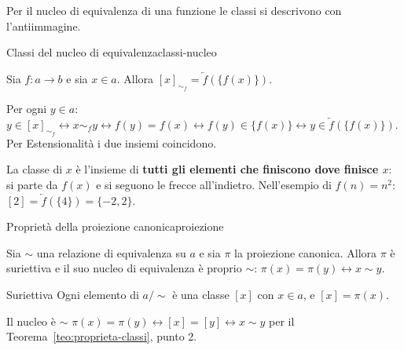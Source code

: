 Per il nucleo di equivalenza di una funzione le classi si descrivono con l'antiimmagine.

\begin{concetto}
\begin{Proposizione}{Classi del nucleo di equivalenza}{classi-nucleo}
    \begin{prerequisiti}
    \end{prerequisiti}
    Sia $f \colon a \to b$ e sia $x \in a$. Allora $[x]_{\sim_f} = \overleftarrow{f}(\{f(x)\})$.
\end{Proposizione}
\begin{dimostrazione}
    Per ogni $y \in a$:\quad $y \in [x]_{\sim_f} \leftrightarrow x \sim_f y \leftrightarrow f(y) = f(x) \leftrightarrow f(y) \in \{f(x)\}
    \leftrightarrow y \in \overleftarrow{f}(\{f(x)\})$. Per Estensionalità i due insiemi coincidono.
\end{dimostrazione}
\end{concetto}

\begin{spiegazione}
    La classe di $x$ è l'insieme di \textbf{tutti gli elementi che finiscono dove finisce $x$}: si parte da $f(x)$ e si
    seguono le frecce all'indietro. Nell'esempio di $f(n) = n^2$: $[2] = \overleftarrow{f}(\{4\}) = \{-2, 2\}$.
\end{spiegazione}


\begin{concetto}
\begin{Proposizione}{Proprietà della proiezione canonica}{proiezione}
    \begin{prerequisiti}
    \end{prerequisiti}
    Sia $\sim$ una relazione di equivalenza su $a$ e sia $\pi$ la proiezione canonica. Allora $\pi$ è suriettiva e il suo nucleo
    di equivalenza è proprio $\sim$: $\pi(x) = \pi(y) \leftrightarrow x \sim y$.
\end{Proposizione}
\begin{dimostrazione}
    \begin{caso}{Suriettiva}
        Ogni elemento di $a/{\sim}$ è una classe $[x]$ con $x \in a$, e $[x] = \pi(x)$.
    \end{caso}
    \begin{caso}{Il nucleo è $\sim$}
        $\pi(x) = \pi(y) \leftrightarrow [x] = [y] \leftrightarrow x \sim y$ per il Teorema~\ref{teo:proprieta-classi}, punto 2.
    \end{caso}
\end{dimostrazione}
\end{concetto}

